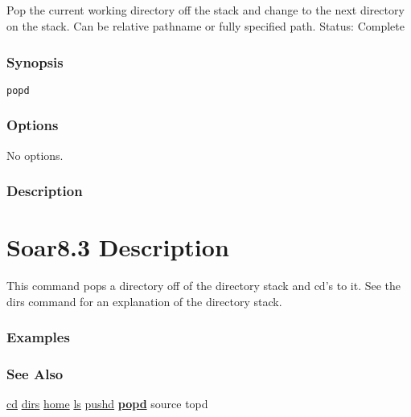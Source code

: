 \subsection{}
\label{popd}
Pop the current working directory off the stack and change to the next directory on the stack. Can be relative pathname or fully specified path. 
 Status: Complete
\subsubsection*{Synopsis}
\begin{verbatim}
popd
\end{verbatim}
\subsubsection*{Options}
 No options. 
\subsubsection*{Description}
\section*{ Soar8.3 Description }
 This command pops a directory off of the directory stack and cd's to it. See the dirs command for an explanation of the directory stack. 
\subsubsection*{Examples}
\subsubsection*{See Also}
\hyperref[cd]{cd} \hyperref[dirs]{dirs} \hyperref[home]{home} \hyperref[ls]{ls} \hyperref[pushd]{pushd} \hyperref[\textbf{popd}]{\textbf{popd}}  source topd
